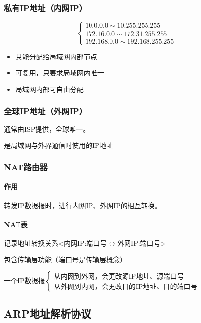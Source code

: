 \subsubsection{私有IP地址（内网IP）}
\[\begin{cases}
    10.0.0.0 \sim 10.255.255.255 \\
    172.16.0.0 \sim 172.31.255.255 \\
    192.168.0.0 \sim 192.168.255.255
\end{cases}\]
\begin{itemize}
    \item 只能分配给局域网内部节点
    \item 可复用，只要求局域网内唯一
    \item 局域网内部可自由分配
\end{itemize}


\subsubsection{全球IP地址（外网IP）}
通常由ISP提供，全球唯一。

是局域网与外界通信时使用的IP地址


\subsubsection{NAT路由器}

\paragraph{作用}
转发IP数据报时，进行内网IP、外网IP的相互转换。

\paragraph{NAT表}
记录地址转换关系<内网IP:端口号\(\leftrightarrow\)外网IP:端口号>

包含传输层功能（端口号是传输层概念）

一个IP数据报\(\begin{cases}
    \text{从内网到外网，会更改源IP地址、源端口号} \\ 
    \text{从外网到内网，会更改目的IP地址、目的端口号}
\end{cases}\)


\subsection{ARP地址解析协议}

